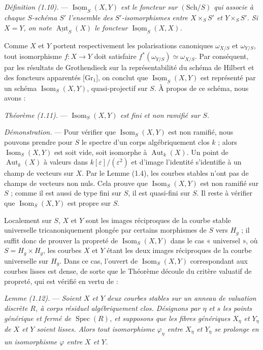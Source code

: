 \documentclass[10pt]{article}
\newcommand{\Spec}{\operatorname{Spec}}
\newcommand{\Aut}{\operatorname{Aut}}
\newcommand{\Isom}{\operatorname{Isom}}
\newcommand{\eps}{\varepsilon}
\begin{document}
\medskip
\noindent\emph{Définition (1.10).} --- \emph{$\underline{\Isom}_S(X,Y)$ est le foncteur sur $(\mathrm{Sch}/S)$ qui associe à chaque $S$-schéma $S'$ l'ensemble des $S'$-isomorphismes entre $X\times_S S'$ et $Y\times_S S'$. Si $X=Y$, on note $\underline{\Aut}_S(X)$ le foncteur $\underline{\Isom}_S(X,X)$.}

Comme $X$ et $Y$ portent respectivement les polarisations canoniques $\omega_{X/S}$ et $\omega_{Y/S}$, tout isomorphisme $f:X\to Y$ doit satisfaire $f^*(\omega_{Y/S})\simeq\omega_{X/S}$. Par conséquent, par les résultats de Grothendieck sur la représentabilité du schéma de Hilbert et des foncteurs apparentés [Gr$_1$], on conclut que $\underline{\Isom}_S(X,Y)$ est représenté par un schéma $\Isom_S(X,Y)$, quasi-projectif sur $S$. À propos de ce schéma, nous avons :

\medskip
\noindent\emph{Théorème (1.11).} --- \emph{$\Isom_S(X,Y)$ est fini et non ramifié sur $S$.}

\noindent\emph{Démonstration.} --- Pour vérifier que $\Isom_S(X,Y)$ est non ramifié, nous pouvons prendre pour $S$ le spectre d'un corps algébriquement clos $k$ ; alors $\Isom_S(X,Y)$ est soit vide, soit isomorphe à $\Aut_k(X)$. Un point de $\Aut_k(X)$ à valeurs dans $k[\eps]/(\eps^2)$ et d'image l'identité s'identifie à un champ de vecteurs sur $X$. Par le Lemme (1.4), les courbes stables n'ont pas de champs de vecteurs non nuls. Cela prouve que $\Isom_S(X,Y)$ est non ramifié sur $S$ ; comme il est aussi de type fini sur $S$, il est quasi-fini sur $S$. Il reste à vérifier que $\Isom_S(X,Y)$ est propre sur $S$.

Localement sur $S$, $X$ et $Y$ sont les images réciproques de la courbe stable universelle tricanoniquement plongée par certains morphismes de $S$ vers $H_g$ ; il suffit donc de prouver la propreté de $\Isom_S(X,Y)$ dans le cas « universel », où $S=H_g\times H_g$, les courbes $X$ et $Y$ étant les deux images réciproques de la courbe universelle sur $H_g$. Dans ce cas, l'ouvert de $\Isom_S(X,Y)$ correspondant aux courbes lisses est dense, de sorte que le Théorème découle du critère valuatif de propreté, qui est vérifié en vertu de :

\medskip
\noindent\emph{Lemme (1.12).} --- \emph{Soient $X$ et $Y$ deux courbes stables sur un anneau de valuation discrète $R$, à corps résiduel algébriquement clos. Désignons par $\eta$ et $s$ les points générique et fermé de $\Spec(R)$, et supposons que les fibres génériques $X_\eta$ et $Y_\eta$ de $X$ et $Y$ soient lisses. Alors tout isomorphisme $\varphi_\eta$ entre $X_\eta$ et $Y_\eta$ se prolonge en un isomorphisme $\varphi$ entre $X$ et $Y$.}
\end{document}
